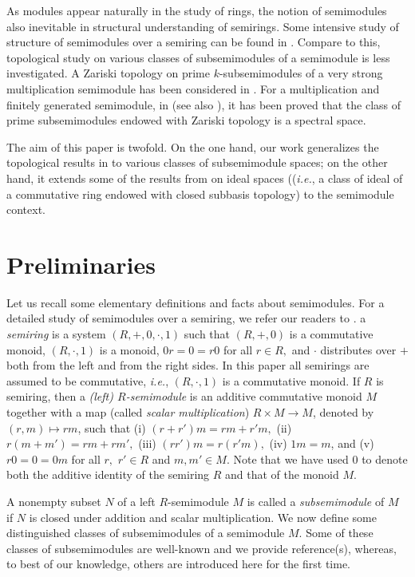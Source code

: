 \documentclass[12pt,english]{smfart}
\theoremstyle{definition}
\begin{document}
As modules appear naturally in the study of rings, the notion of semimodules also inevitable in structural understanding of semirings. Some intensive study of structure of semimodules over a semiring can be found in \cite{G99, AA10, T87, CL22, H17}. Compare to this, topological study on various classes of  subsemimodules of a semimodule is less investigated.  A Zariski topology on  prime $k$-subsemimodules of a very strong multiplication semimodule has been considered in \cite{AAT11}. For a multiplication and finitely generated semimodule, in \cite{HPH21} (see also \cite{HHP22}), it has been proved that the class of prime subsemimodules endowed with Zariski topology is a spectral space.

The aim of this paper is twofold. On the one hand, our work generalizes the topological results in \cite{AAT11, HPH21, HHP22} to various classes of subsemimodule spaces; on the other hand, it extends some of the results from \cite{DG22} on ideal spaces ((\textit{i.e.}, a class of ideal of a commutative ring endowed with closed subbasis topology) to the semimodule context.
 
\section{Preliminaries}\label{prelim}
Let us recall some elementary definitions and facts about semimodules. For a detailed study of semimodules over a semiring, we refer our readers to \cite{G99}. a \emph{semiring} is a system $(R,+,0,\cdot, 1)$ such that $(R,+,0)$ is a commutative monoid, $(R, \cdot,1)$ is a monoid, $0r=0=r0$ for all $r\in R,$ and $\cdot$ distributes over $+$ both from the left and
from the right sides. In this paper all semirings are assumed to be commutative, \textit{i.e.}, $(R, \cdot,1)$ is a commutative monoid. If $R$ is semiring, then a \emph{(left) $R$-semimodule} is an additive commutative monoid $M$ together with a map (called \emph{scalar multiplication}) $R\times M\to M$, denoted by $(r,m)\mapsto rm$, such that (i) $(r+r')m=rm+r'm,$ (ii) $r(m+m')=rm+rm',$ (iii) $(rr')m=r(r'm),$ (iv) $1m=m$, and (v) $r0=0=0m$ for all $r,$ $r'\in R$ and $m, m'\in M.$ Note that we have used $0$ to denote both the additive identity of the semiring $R$ and that of the monoid $M$.

A nonempty subset $N$ of a left $R$-semimodule $M$ is called a \emph{subsemimodule} of $M$ if $N$ is closed under addition and scalar multiplication. We now define some distinguished classes of subsemimodules of a semimodule $M$. Some of these classes of subsemimodules are well-known and we provide reference(s), whereas, to best of our knowledge, others are introduced here for the first time. 
\end{document}
